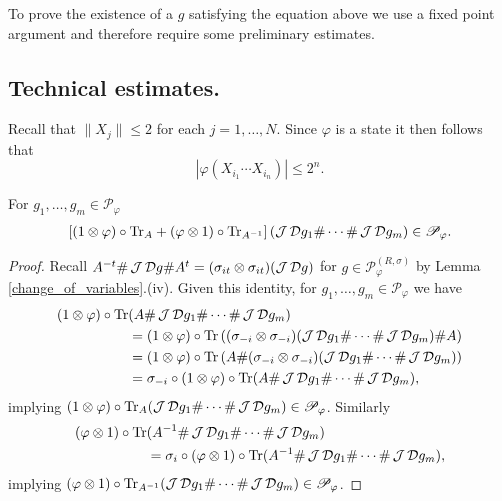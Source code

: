 To prove the existence of a $g$ satisfying the equation above we use a fixed point argument and therefore require some preliminary estimates.



\subsection{Technical estimates.}\label{technical_estimates}

Recall that $\|X_j\|\leq 2$ for each $j=1,\ldots, N$. Since $\varphi$ is a state it then follows that
	\begin{equation}\label{phi_monomial}	
		|\varphi(X_{i_1}\cdots X_{i_n})|\leq 2^n.
	\end{equation}
	
\begin{lem}\label{centralizer_commutes_with_A}
For $g_1,\ldots, g_m\in \mathscr{P}_{\varphi}$
	\begin{align*}
		\left[(1\otimes\varphi)\circ\text{Tr}_A+(\varphi\otimes1)\circ\text{Tr}_{A^{-1}}\right]( \operatorname{\mathcal J}\mathcal D g_1\#\cdots\# \operatorname{\mathcal J}\mathcal D g_m)\in \mathscr{P}_\varphi.
	\end{align*}
\end{lem}
\begin{proof}
Recall $A^{-t}\# \operatorname{\mathcal J}\mathcal D g\# A^t=(\sigma_{it}\otimes \sigma_{it})(\operatorname{\mathcal J}\mathcal D g)$ for $g\in\mathscr{P}_{\varphi}^{(R,\sigma)}$ by Lemma \ref{change_of_variables}.(iv). Given this identity, for $g_1,\ldots, g_m\in \mathscr{P}_\varphi$ we have
	\begin{align*}
		(1\otimes \varphi)\circ\text{Tr}&(A\# \operatorname{\mathcal J}\mathcal D g_1\#\cdots \# \operatorname{\mathcal J}\mathcal D g_m)\\
			&=(1\otimes\varphi)\circ\text{Tr}\left( (\sigma_{-i}\otimes\sigma_{-i})(\operatorname{\mathcal J}\mathcal D g_1\#\cdots\# \operatorname{\mathcal J}\mathcal D g_m)\# A\right)\\
												&=(1\otimes\varphi)\circ\text{Tr}\left( A\#(\sigma_{-i}\otimes\sigma_{-i})(\operatorname{\mathcal J}\mathcal D g_1\#\cdots\# \operatorname{\mathcal J}\mathcal D g_m)\right)\\
												&=\sigma_{-i}\circ(1\otimes\varphi)\circ\text{Tr}(A\# \operatorname{\mathcal J}\mathcal D g_1\#\cdots\# \operatorname{\mathcal J}\mathcal D g_m),
	\end{align*}
implying $(1\otimes \varphi)\circ\text{Tr}_A(\operatorname{\mathcal J}\mathcal D g_1\#\cdots \# \operatorname{\mathcal J}\mathcal D g_m)\in\mathscr{P}_\varphi$. Similarly
	\begin{align*}
		(\varphi\otimes 1)\circ\text{Tr}&(A^{-1}\# \operatorname{\mathcal J}\mathcal D g_1\#\cdots \# \operatorname{\mathcal J}\mathcal D g_m)\\
			&=\sigma_{i}\circ (\varphi\otimes 1)\circ\text{Tr}(A^{-1}\# \operatorname{\mathcal J}\mathcal D g_1\#\cdots \# \operatorname{\mathcal J}\mathcal D g_m),
	\end{align*}
implying $(\varphi\otimes 1)\circ\text{Tr}_{A^{-1}} (\operatorname{\mathcal J}\mathcal D g_1\#\cdots \# \operatorname{\mathcal J}\mathcal D g_m)\in\mathscr{P}_\varphi$.
\end{proof}

